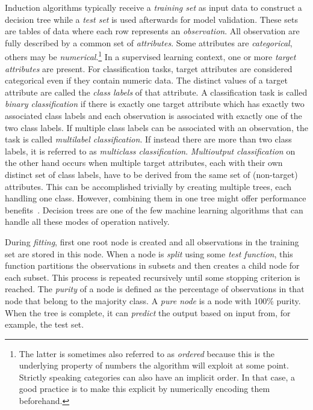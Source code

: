 Induction algorithms typically receive a \emph{training set} as input data to construct a decision tree while a \emph{test set} is used afterwards for model validation. These sets are tables of data where each row represents an \emph{observation}. All observation are fully described by a common set of \emph{attributes}. Some attributes are \emph{categorical}, others may be \emph{numerical}.\footnote{The latter is sometimes also referred to as \emph{ordered} because this is the underlying property of numbers the algorithm will exploit at some point. Strictly speaking categories can also have an implicit order. In that case, a good practice is to make this explicit by numerically encoding them beforehand.} In a supervised learning context, one or more \emph{target attributes} are present. For classification tasks, target attributes are considered categorical even if they contain numeric data. The distinct values of a target attribute are called the \emph{class labels} of that attribute. A classification task is called \emph{binary classification} if there is exactly one target attribute which has exactly two associated class labels and each observation is associated with exactly one of the two class labels. If multiple class labels can be associated with an observation, the task is called \emph{multilabel classification}. If instead there are more than two class labels, it is referred to as \emph{multiclass classification}. \emph{Multioutput classification} on the other hand occurs when multiple target attributes, each with their own distinct set of class labels, have to be derived from the same set of (non-target) attributes. This can be accomplished trivially by creating multiple trees, each handling one class. However, combining them in one tree might offer performance benefits~\cite{vens2008decision, multioutput-better}. Decision trees are one of the few machine learning algorithms that can handle all these modes of operation natively.

During \emph{fitting}, first one root node is created and all observations in the training set are stored in this node. When a node is \emph{split} using some \emph{test function}, this function partitions the observations in subsets and then creates a child node for each subset. This process is repeated recursively until some stopping criterion is reached. The \emph{purity} of a node is defined as the percentage of observations in that node that belong to the majority class. A \emph{pure node} is a node with 100\% purity. When the tree is complete, it can \emph{predict} the output based on input from, for example, the test set.

